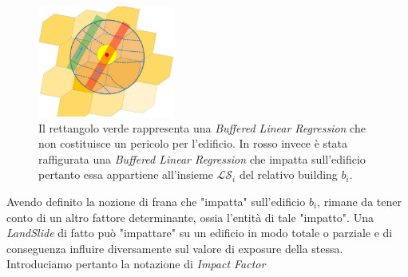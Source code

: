 \begin{enumerate}
	\begin{figure}[h]
		\centering
		\includegraphics[width=0.4\textwidth]{images/landslides}
		\caption{Il rettangolo verde rappresenta una \textit{Buffered Linear Regression} che non costituisce un pericolo per l'edificio. In rosso invece è stata raffigurata una \textit{Buffered Linear Regression} che impatta sull'edificio pertanto essa appartiene all'insieme $\mathcal{LS}_i$ del relativo building $b_i$.}
	\label{landslides}
	\end{figure}
	

	
\end{enumerate}

Avendo definito la nozione di frana che "impatta" sull'edificio $b_i$, rimane da tener conto di un altro fattore determinante, ossia l'entità di tale "impatto". Una \textit{LandSlide} di fatto può "impattare" su un edificio in modo totale o parziale e di conseguenza influire diversamente sul valore di exposure della stessa. Introduciamo pertanto la notazione di \textit{Impact Factor}

